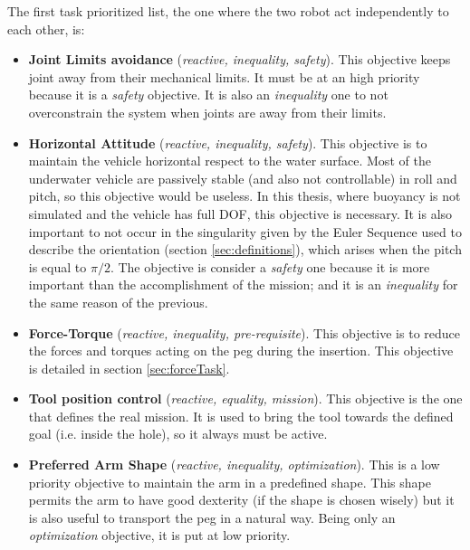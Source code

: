 The first task prioritized list, the one where the two robot act independently to each other, is:
\begin{itemize}
	\item \textbf{Joint Limits avoidance} (\textit{reactive, inequality, safety}). This objective keeps joint away from their mechanical limits. It must be at an high priority because it is a \textit{safety} objective. It is also an \textit{inequality} one to not overconstrain the system when joints are away from their limits.
	
	\item \textbf{Horizontal Attitude} (\textit{reactive, inequality, safety}). This objective is to maintain the vehicle horizontal respect to the water surface. Most of the underwater vehicle are passively stable (and also not controllable) in roll and pitch, so this objective would be useless. In this thesis, where buoyancy is not simulated and the vehicle has full DOF, this objective is necessary. It is also important to not occur in the singularity given by the Euler Sequence used to describe the orientation (section \ref{sec:definitions}), which arises when the pitch is equal to $\pi/2$. The objective is consider a \textit{safety} one because it is more important than the accomplishment of the mission; and it is an \textit{inequality} for the same reason of the previous. 
	
	\item \textbf{Force-Torque} (\textit{reactive, inequality, pre-requisite}). This objective is to reduce the forces and torques acting on the peg during the insertion. This objective is detailed in section \ref{sec:forceTask}.
	
	\item \textbf{Tool position control} (\textit{reactive, equality, mission}). This objective is the one that defines the real mission. It is used to bring the tool towards the defined goal (i.e. inside the hole), so it always must be active.
	
	\item \textbf{Preferred Arm Shape} (\textit{reactive, inequality, optimization}). This is a low priority objective to maintain the arm in a predefined shape. This shape permits the arm to have good dexterity (if the shape is chosen wisely) but it is also useful to transport the peg in a natural way. Being only an \textit{optimization} objective, it is put at low priority.
		
\end{itemize}

